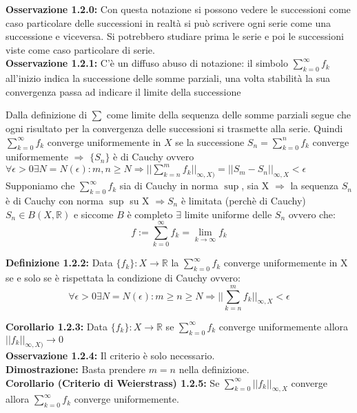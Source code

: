 \documentclass[a4paper,11pt,titlepage]{book}
\begin{document}
\textbf{Osservazione 1.2.0:} Con questa notazione si possono vedere le successioni come caso particolare delle successioni in realtà si può scrivere ogni serie come una successione e viceversa. Si potrebbero studiare prima le serie e poi le successioni viste come caso particolare di serie.\\

\textbf{Osservazione 1.2.1:} C'è un diffuso abuso di notazione: il simbolo $\sum_{k=0}^\infty f_{k}$ all'inizio indica la successione delle somme parziali, una volta stabilità la sua convergenza passa ad indicare il limite della successione


Dalla definizione di $\sum$ come limite della sequenza delle somme parziali segue che ogni risultato per la convergenza delle successioni si trasmette alla serie.
Quindi $\sum_{k=0}^\infty f_{k}$ converge uniformemente in $X$ se  la successione $S_n=\sum_{k=0}^{n}f_k$ converge uniformemente $\Rightarrow$ $\{S_n\}$ è di Cauchy ovvero $\forall{\epsilon}>0 \exists N=N(\epsilon): m,n\geq N \Rightarrow ||\sum_{k=n}^{m} f_{k}||_{\infty,X)}=||S_m-S_n||_{\infty,X}<\epsilon$\\

Supponiamo che $\sum_{k=0}^{\infty} f_{k}$ sia di Cauchy in norma $\sup$, sia X $\Rightarrow$ la sequenza $S_n$ è di Cauchy con norma $\sup$ su X $\Rightarrow S_n$ è limitata (perchè di Cauchy) $S_n\in B(X,\mathbb{R})$ e siccome $B$ è completo $\exists$ limite uniforme delle $S_n$ ovvero che: $$f:=\sum\limits_{k=0}^{\infty}f_k=\lim\limits_{k\to\infty}f_k$$

\textbf{Definizione 1.2.2:} Data $\{f_{k}\}:X\rightarrow\mathbb{R}$ la $\sum_{k=0}^\infty f_{k}$ converge uniformemente in X se e solo se è rispettata la condizione di Cauchy ovvero: $$\forall\epsilon >0 \exists N=N(\epsilon): m\geq n\geq N \Rightarrow ||\sum\limits_{k=n}^{m} f_{k}||_{\infty,X}<\epsilon$$

\textbf{Corollario 1.2.3:} Data $\{f_{k}\}:X\rightarrow\mathbb{R}$ se $\sum_{k=0}^\infty f_{k}$ converge uniformemente allora $||f_k||_{\infty,X)}\to 0$\\

\textbf{Osservazione 1.2.4:} Il criterio è solo necessario.\\

\textbf{Dimostrazione:} Basta prendere $m=n$ nella definizione. \\

\textbf{Corollario (Criterio di Weierstrass) 1.2.5:} Se $\sum_{k=0}^{\infty}||f_k||_{\infty,X}$ converge allora $\sum_{k=0}^{\infty}f_k$ converge uniformemente. \\
\end{document}
